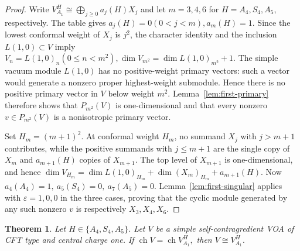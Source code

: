 \documentclass[12pt,leqno]{amsart}
\numberwithin{equation}{section} \newtheorem{thm}{Theorem}[section] \newtheorem{lem}[thm]{Lemma} \newtheorem{ex}[thm]{Example} \newtheorem{prop}[thm]{Proposition} \newtheorem{cor}[thm]{Corollary} \newtheorem{defi}[thm]{Definition} \newtheorem{rmk}[thm]{Remark} \newtheorem{notation}[thm]{Notation}
\newcommand{\ch}{\operatorname{ch}}
\begin{document}
\begin{proof}
Write \(V_{A_1}^H\cong\bigoplus_{j\ge0}a_j(H)X_j\) and let $m=3,4,6$ for $H=A_4,S_4,A_5$, respectively. The table gives \(a_j(H)=0(0<j<m),a_m(H)=1.\) Since the lowest conformal weight of $X_j$ is $j^2$, the character identity and the inclusion $L(1,0)\subset V$ imply \(V_n=L(1,0)_n(0\le n<m^2),\dim V_{m^2}=\dim L(1,0)_{m^2}+1.\) The simple vacuum module $L(1,0)$ has no positive-weight primary vectors: such a vector would generate a nonzero proper highest-weight submodule. Hence there is no positive primary vector in $V$ below weight $m^2$. Lemma~\ref{lem:first-primary} therefore shows that \(P_{m^2}(V)\) is one-dimensional and that every nonzero \(v\in P_{m^2}(V)\) is a nonisotropic primary vector.

Set $H_m=(m+1)^2$. At conformal weight $H_m$, no summand $X_j$ with $j>m+1$ contributes, while the positive summands with $j\le m+1$ are the single copy of $X_m$ and $a_{m+1}(H)$ copies of $X_{m+1}$. The top level of $X_{m+1}$ is one-dimensional, and hence \(\dim V_{H_m}=\dim L(1,0)_{H_m}+\dim(X_m)_{H_m}+a_{m+1}(H).\) Now \(a_4(A_4)=1,\ a_5(S_4)=0,\ a_7(A_5)=0\). Lemma~\ref{lem:first-singular} applies with $\varepsilon=1,0,0$ in the three cases, proving that the cyclic module generated by any such nonzero $v$ is respectively $X_3,X_4,X_6$.
\end{proof}

\begin{thm}\label{thm:exceptional-rigidity}
Let $H\in\{A_4,S_4,A_5\}$. Let $V$ be a simple self-contragredient VOA of CFT type and central charge one. If \(\ch V=\ch V_{A_1}^{H},\) then \(V\cong V_{A_1}^{H}.\)
\end{thm}
\end{document}
